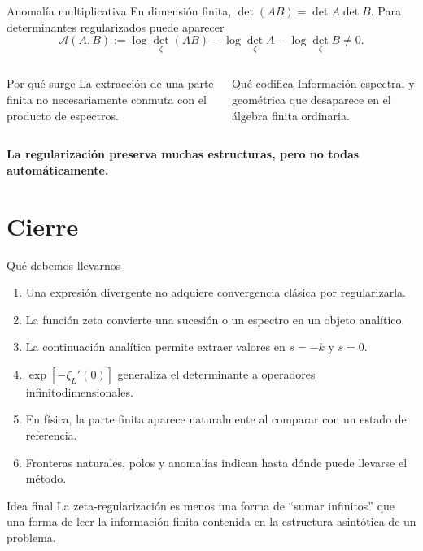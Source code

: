 \documentclass[aspectratio=169,11pt]{beamer}
\newcommand{\highlight}[1]{\textcolor{UdeAGreen}{\bfseries #1}}
\begin{document}
\begin{frame}{Anomalía multiplicativa}
  En dimensión finita, $\det(AB)=\det A\det B$. Para determinantes regularizados puede
  aparecer
  \[
    \mathcal A(A,B)
      :=\log\det_{\zeta}(AB)
       -\log\det_{\zeta}A
       -\log\det_{\zeta}B\neq0.
  \]
  \pause
  \begin{columns}[T,onlytextwidth]
      \begin{block}{Por qué surge}
        La extracción de una parte finita no necesariamente conmuta con el producto de
        espectros.
      \end{block}
      \pause
      \begin{block}{Qué codifica}
        Información espectral y geométrica que desaparece en el álgebra finita
        ordinaria.
      \end{block}
  \end{columns}
  \pause
  \vfill
  \centering\highlight{La regularización preserva muchas estructuras, pero no todas automáticamente.}
\end{frame}

\section{Cierre}

\begin{frame}{Qué debemos llevarnos}
  \begin{enumerate}[<+->]
    \item Una expresión divergente no adquiere convergencia clásica por regularizarla.
    \item La función zeta convierte una sucesión o un espectro en un objeto analítico.
    \item La continuación analítica permite extraer valores en $s=-k$ y $s=0$.
    \item $\exp[-\zeta_L'(0)]$ generaliza el determinante a operadores infinitodimensionales.
    \item En física, la parte finita aparece naturalmente al comparar con un estado de referencia.
    \item Fronteras naturales, polos y anomalías indican hasta dónde puede llevarse el método.
  \end{enumerate}
  \pause
  \begin{alertblock}{Idea final}
    La zeta-regularización es menos una forma de ``sumar infinitos'' que una forma de
    leer la información finita contenida en la estructura asintótica de un problema.
  \end{alertblock}
\end{frame}
\end{document}
